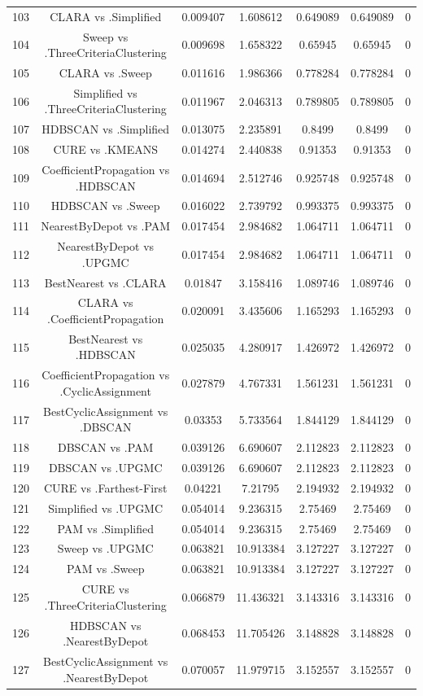 \documentclass[a4paper,10pt]{article}
\begin{document}
\begin{landscape}
\begin{table}[!htp]
\begin{tabular}{ccccccc}
103&CLARA vs .Simplified&0.009407&1.608612&0.649089&0.649089&0\\
104&Sweep vs .ThreeCriteriaClustering&0.009698&1.658322&0.65945&0.65945&0\\
105&CLARA vs .Sweep&0.011616&1.986366&0.778284&0.778284&0\\
106&Simplified vs .ThreeCriteriaClustering&0.011967&2.046313&0.789805&0.789805&0\\
107&HDBSCAN vs .Simplified&0.013075&2.235891&0.8499&0.8499&0\\
108&CURE vs .KMEANS&0.014274&2.440838&0.91353&0.91353&0\\
109&CoefficientPropagation vs .HDBSCAN&0.014694&2.512746&0.925748&0.925748&0\\
110&HDBSCAN vs .Sweep&0.016022&2.739792&0.993375&0.993375&0\\
111&NearestByDepot vs .PAM&0.017454&2.984682&1.064711&1.064711&0\\
112&NearestByDepot vs .UPGMC&0.017454&2.984682&1.064711&1.064711&0\\
113&BestNearest vs .CLARA&0.01847&3.158416&1.089746&1.089746&0\\
114&CLARA vs .CoefficientPropagation&0.020091&3.435606&1.165293&1.165293&0\\
115&BestNearest vs .HDBSCAN&0.025035&4.280917&1.426972&1.426972&0\\
116&CoefficientPropagation vs .CyclicAssignment&0.027879&4.767331&1.561231&1.561231&0\\
117&BestCyclicAssignment vs .DBSCAN&0.03353&5.733564&1.844129&1.844129&0\\
118&DBSCAN vs .PAM&0.039126&6.690607&2.112823&2.112823&0\\
119&DBSCAN vs .UPGMC&0.039126&6.690607&2.112823&2.112823&0\\
120&CURE vs .Farthest-First&0.04221&7.21795&2.194932&2.194932&0\\
121&Simplified vs .UPGMC&0.054014&9.236315&2.75469&2.75469&0\\
122&PAM vs .Simplified&0.054014&9.236315&2.75469&2.75469&0\\
123&Sweep vs .UPGMC&0.063821&10.913384&3.127227&3.127227&0\\
124&PAM vs .Sweep&0.063821&10.913384&3.127227&3.127227&0\\
125&CURE vs .ThreeCriteriaClustering&0.066879&11.436321&3.143316&3.143316&0\\
126&HDBSCAN vs .NearestByDepot&0.068453&11.705426&3.148828&3.148828&0\\
127&BestCyclicAssignment vs .NearestByDepot&0.070057&11.979715&3.152557&3.152557&0\\

\end{tabular}
\end{table}
\end{landscape}
\end{document}
